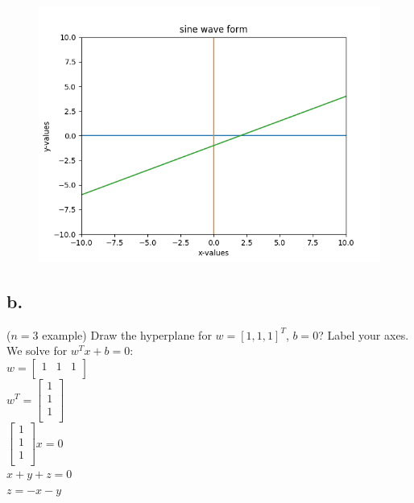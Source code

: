 \documentclass{article}
\newcommand{\1}{\mathbf{1}}
\begin{document}
{\begin{figure}[ht!]
  \centering
  \includegraphics[width=150mm]{A9a.PNG}
\end{figure}

\subsection*{b.}
($n=3$ example) Draw the hyperplane for $w=[1,1,1]^T$, $b=0$? Label your axes. \\ 
We solve for $w^T x + b = 0$: \\
$w = \begin{bmatrix} 1 & 1 & 1 \\ \end{bmatrix}$ \\
$w^T = \begin{bmatrix} 1 \\ 1 \\ 1 \\ \end{bmatrix}$ \\
$\begin{bmatrix} 1 \\ 1 \\ 1 \\ \end{bmatrix} x = 0$ \\ 
$x + y + z = 0$ \\
$z = -x - y$ \\

}
\end{document}
